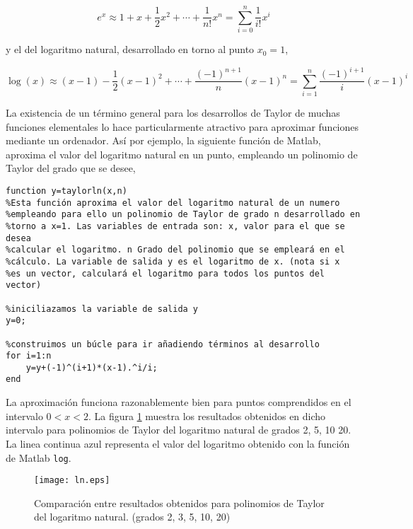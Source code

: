 \begin{equation*}
e^x\approx 1+x+\frac{1}{2}x^2+\cdots+\frac{1}{n!}x^n=\sum_{i=0}^n\frac{1}{i!}x^i
\end{equation*}

y el del logaritmo natural, desarrollado en torno al punto $x_0=1$, 

\begin{equation*}
\log(x)\approx (x-1)-\frac{1}{2}(x-1)^2+\cdots+\frac{(-1)^{n+1}}{n}(x-1)^n=\sum_{i=1}^n\frac{(-1)^{i+1}}{i}(x-1)^i
\end{equation*}

La existencia de un término general para los desarrollos de Taylor de muchas funciones elementales lo hace particularmente atractivo para aproximar funciones mediante un ordenador. Así por ejemplo, la siguiente función de Matlab, aproxima el valor del logaritmo natural en un punto, empleando un polinomio de Taylor del grado que se desee,

\begin{verbatim}
function y=taylorln(x,n)
%Esta función aproxima el valor del logaritmo natural de un numero
%empleando para ello un polinomio de Taylor de grado n desarrollado en 
%torno a x=1. Las variables de entrada son: x, valor para el que se desea 
%calcular el logaritmo. n Grado del polinomio que se empleará en el 
%cálculo. La variable de salida y es el logaritmo de x. (nota si x
%es un vector, calculará el logaritmo para todos los puntos del vector)

%iniciliazamos la variable de salida y
y=0;

%construimos un búcle para ir añadiendo términos al desarrollo
for i=1:n
    y=y+(-1)^(i+1)*(x-1).^i/i;
end
\end{verbatim}

La aproximación funciona razonablemente bien para puntos comprendidos en el intervalo $0<x<2$. La figura \ref{fig:ln} muestra los resultados obtenidos en dicho intervalo para polinomios de Taylor del logaritmo natural de grados 2, 5, 10 20. La linea continua azul representa el valor del logaritmo obtenido con la función de Matlab \texttt{log}.

\begin{figure}[h]
\centering
\texttt{[image: ln.eps]}
\caption{Comparación entre resultados obtenidos para polinomios de Taylor del logaritmo natural. (grados 2, 3, 5, 10, 20)}
\label{fig:ln}
\end{figure}

